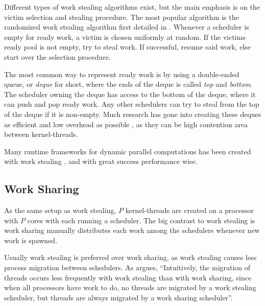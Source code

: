 Different types of work stealing algorithms exist, but the main emphasis is on the victim selection and stealing procedure. The most popular algorithm is the randomized work stealing algorithm first detailed in \citet{blumofe1999scheduling}. Whenever a scheduler is empty for ready work, a victim is chosen uniformly at random. If the victims ready pool is not empty, try to steal work. If successful, resume said work, else start over the selection procedure.

The most common way to represent ready work is by using a double\hyp{}ended queue, or \textit{deque} for short, where the ends of the deque is called \textit{top} and \textit{bottom}. The scheduler owning the deque has access to the bottom of the deque, where it can push and pop ready work. Any other schedulers can try to steal from the top of the deque if it is non\hyp{}empty. Much research has gone into creating these deques as efficient and low overhead as possible \citep{chase2005dynamic,le2013correct}, as they can be high contention area between kernel\hyp{}threads.

Many runtime frameworks for dynamic parallel computations has been created with work stealing \citep{blumofe1996cilk,sunderam1990pvm}, and with great success performance wise.


\subsection{Work Sharing}
\label{subsec:work_sharing}

As the same setup as work stealing, $P$ kernel\hyp{}threads are created on a processor with $P$ cores with each running a scheduler. The big contrast to work stealing is work sharing manually distributes each work among the schedulers whenever new work is spawned. 

Usually work stealing is preferred over work sharing, as work stealing causes less process migration between schedulers. As \citet[page 721]{blumofe1999scheduling} argues, ``Intuitively, the migration of threads occurs less frequently with work stealing than with work sharing, since when all processors have work to do, no threads are migrated by a work stealing scheduler, but threads are always migrated by a work sharing scheduler''.

